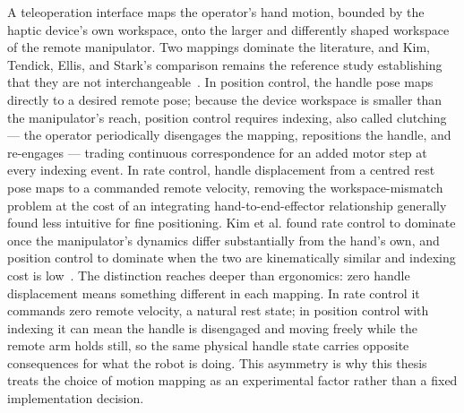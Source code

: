\documentclass[12pt,a4paper,twoside,openright]{report}
\begin{document}
\label{sec:sota-mappings}
A teleoperation interface maps the operator's hand motion, bounded by the haptic device's own workspace, onto the larger and differently shaped workspace of the remote manipulator. Two mappings dominate the literature, and Kim, Tendick, Ellis, and Stark's comparison remains the reference study establishing that they are not interchangeable~\cite{kim1987comparison}. In position control, the handle pose maps directly to a desired remote pose; because the device workspace is smaller than the manipulator's reach, position control requires indexing, also called clutching --- the operator periodically disengages the mapping, repositions the handle, and re-engages --- trading continuous correspondence for an added motor step at every indexing event. In rate control, handle displacement from a centred rest pose maps to a commanded remote velocity, removing the workspace-mismatch problem at the cost of an integrating hand-to-end-effector relationship generally found less intuitive for fine positioning. Kim et al. found rate control to dominate once the manipulator's dynamics differ substantially from the hand's own, and position control to dominate when the two are kinematically similar and indexing cost is low~\cite{kim1987comparison}. The distinction reaches deeper than ergonomics: zero handle displacement means something different in each mapping. In rate control it commands zero remote velocity, a natural rest state; in position control with indexing it can mean the handle is disengaged and moving freely while the remote arm holds still, so the same physical handle state carries opposite consequences for what the robot is doing. This asymmetry is why this thesis treats the choice of motion mapping as an experimental factor rather than a fixed implementation decision.
\end{document}
